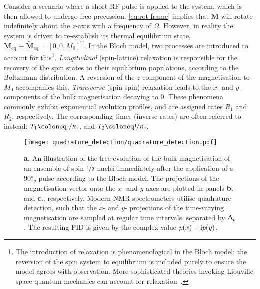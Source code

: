 Consider a scenario where a short \ac{RF} pulse is applied to the system, which
is then allowed to undergo free precession. \cref{eq:rot-frame} implies that
$\tilde{\symbf{M}}$ will rotate indefinitely about the $z$-axis with a
frequency of $\Omega$. However, in reality the system is driven to re-establish
its thermal equilibrium state, $\symbf{M}_{\text{eq}} \equiv
\tilde{\symbf{M}}_{\text{eq}} = [0, 0, M_0]^{\mathrm{T}}$. In the
Bloch model, two processes are introduced to account for this\footnote{
    The introduction of relaxation is phenomenological in the Bloch model; the
    reversion of the spin system to equilibrium is included purely to ensure
    the model agrees with observation. More sophisticated theories invoking
    Liouville-space quantum mechanics can account for
    relaxation~\cite{Goldman2001,Kuprov2007}.
}. \emph{Longitudinal} (spin-lattice)
relaxation is responsible for the recovery of the spin states to their
equilibrium populations, according to the Boltzmann distribution. A reversion
of the $z$-component of the magnetisation to $M_0$ accompanies this.
\emph{Transverse} (spin-spin) relaxation leads to the $x$- and $y$-components
of the bulk magnetisation decaying to $0$. These phenomena commonly exhibit
exponential evolution profiles, and are assigned rates $R_1$ and $R_2$,
respectively. The corresponding times (inverse rates) are often referred to
instead:
$T_1 \coloneq \nicefrac{1}{R_1}$, and
$T_2 \coloneq \nicefrac{1}{R_2}$.
\begin{figure}
    \centering
    \texttt{[image: quadrature\_detection/quadrature\_detection.pdf]}
    \caption[
        An illustration of the free evolution of the bulk
        magnetisation of an ensemble of spin-$\nicefrac{1}{2}$ nuclei
        according to the Bloch model.
    ]{
        \textbf{a.} An illustration of the free evolution of the bulk
        magnetisation of an ensemble of spin-$\nicefrac{1}{2}$ nuclei
        immediately after the application of a $\ang{90}_y$ pulse according to
        the Bloch model.
        The projections of the magnetisation vector onto the
        $x$- and  $y$-axes are plotted in panels \textbf{b.} and \textbf{c.},
        respectively. Modern \acs{NMR} spectrometers utilise quadrature
        detection, such that the $x$- and  $y$- projections of the time-varying
        magnetisation are sampled at regular time intervals, separated by
        $\Updelta_t$.  The resulting \acs{FID} is given by the complex value $p(x) +
        \mathrm{i} p(y)$.
    }\label{fig:quadrature}
\end{figure}

